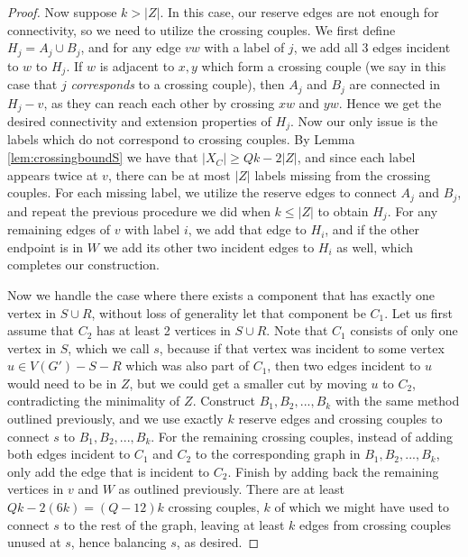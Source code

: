 \documentclass{article}
\begin{document}
\begin{proof}
    Now suppose $k > |Z|$. In this case, our reserve edges are not enough for connectivity, so we need to utilize the crossing couples. We first define $H_j = A_j \cup B_j$, and for any edge $vw$ with a label of $j$, we add all 3 edges incident to $w$ to $H_j$. If $w$ is adjacent to $x,y$ which form a crossing couple (we say in this case that $j$ \emph{corresponds} to a crossing couple), then $A_j$ and $B_j$ are connected in $H_j-v$, as they can reach each other by crossing $xw$ and $yw$. Hence we get the desired connectivity and extension properties of $H_j$. Now our only issue is the labels which do not correspond to crossing couples. By Lemma \ref{lem:crossingboundS} we have that $|X_C| \geq Qk-2|Z|$, and since each label appears twice at $v$, there can be at most $|Z|$ labels missing from the crossing couples. For each missing label, we utilize the reserve edges to connect $A_j$ and $B_j$, and repeat the previous procedure we did when $k \leq |Z|$ to obtain $H_j$. For any remaining edges of $v$ with label $i$, we add that edge to $H_i$, and if the other endpoint is in $W$ we add its other two incident edges to $H_i$ as well, which completes our construction. 

    Now we handle the case where there exists a component that has exactly one vertex in $S \cup R$, without loss of generality let that component be $C_1$. Let us first assume that $C_2$ has at least 2 vertices in $S \cup R$. Note that $C_1$ consists of only one vertex in $S$, which we call $s$, because if that vertex was incident to some vertex $u \in V(G')-S-R$ which was also part of $C_1$, then two edges incident to $u$ would need to be in $Z$, but we could get a smaller cut by moving $u$ to $C_2$, contradicting the minimality of $Z$. Construct $B_1,B_2,...,B_k$ with the same method outlined previously, and we use exactly $k$ reserve edges and crossing couples to connect $s$ to $B_1,B_2,...,B_k$. For the remaining crossing couples, instead of adding both edges incident to $C_1$ and $C_2$ to the corresponding graph in $B_1,B_2,...,B_k$, only add the edge that is incident to $C_2$. Finish by adding back the remaining vertices in $v$ and $W$ as outlined previously. There are at least $Qk-2(6k)=(Q-12)k$ crossing couples, $k$ of which we might have used to connect $s$ to the rest of the graph, leaving at least $k$ edges from crossing couples unused at $s$, hence balancing $s$, as desired. 


\end{proof}
\end{document}
